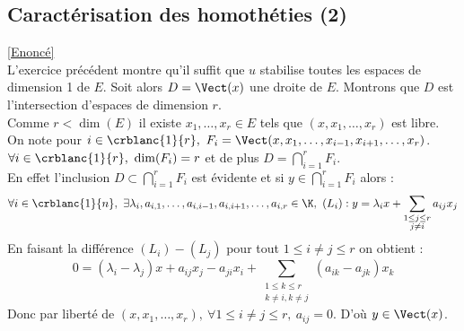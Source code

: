 \documentclass[8pt]{book}
\begin{document}
	\subsection{Caractérisation des homothéties (2) }
	\label{Caractérisation des homothéties (2) corrigé}
	\textcolor{blue}{\hyperref[Caractérisation des homothéties (2)]{[Enoncé]}}\\
	L'exercice précédent montre qu'il suffit que $u$ stabilise toutes les espaces de dimension 1 de $E$. Soit alors $D=\Vect(x)$ une droite de $E$. Montrons que $D$ est l'intersection d'espaces de dimension $r$.\\
	Comme $r<\dim(E)$ il existe $x_1,\dots,x_r\in E$ tels que $(x,x_1,\dots,x_r)$ est libre. On note pour $i\in \crblanc{1}{r},\ F_i=\Vect(x,x_1,\dots,x_{i-1},x_{i+1},\dots,x_r)$.\\
	$\forall i\in \crblanc{1}{r},\ \dim(F_i)=r$ et de plus $D=\displaystyle\bigcap_{i=1}^rF_i$.\\
	En effet l'inclusion $D\subset \displaystyle\bigcap_{i=1}^rF_i$ est évidente et si $y\in \displaystyle\bigcap_{i=1}^rF_i$ alors :\\
	$$\forall i\in \crblanc{1}{n},\ \exists \lambda_i,a_{i,1},\dots,a_{i,i-1},a_{i,i+1},\dots,a_{i,r}\in \K,\ (L_i) : y=\lambda_ix+\sum_{\substack{1\leq j\leq r\\j\ne i}}a_{ij}x_j$$
	En faisant la différence $(L_i) - (L_j)$ pour tout $1\leq i\ne j\leq r$ on obtient :
	$$0=(\lambda_i-\lambda_j)x+a_{ij}x_j-a_{ji}x_i+\sum_{\substack{1\leq k\leq r\\k\ne i,k\ne j}}(a_{ik}-a_{jk})x_k$$
	Donc par liberté de $(x,x_1,\dots,x_r),\ \forall 1\leq i\ne j\leq r,\ a_{ij}=0$. D'où $y\in \Vect(x)$.
	
\end{document}
